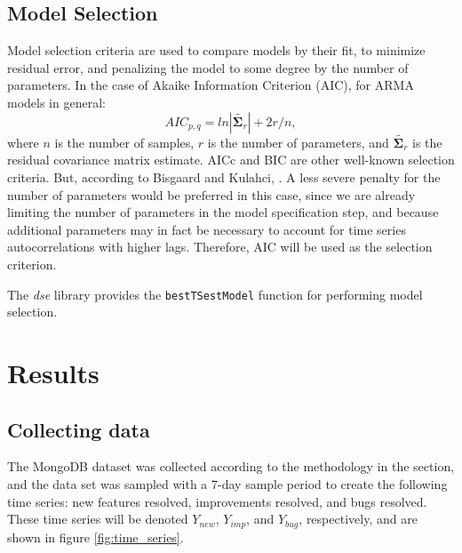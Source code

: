 \documentclass[a4paper]{scrartcl}
\begin{document}
\subsection*{Model Selection}
Model selection criteria are used to compare models by their fit, to minimize residual error, and penalizing the model to some degree by the number of parameters. In the case of Akaike Information Criterion (AIC), for ARMA models in general:
\begin{equation}
AIC_{p,q}=ln{|\tilde{\mathbf{\Sigma}_r}|}+2r/n,
\end{equation}
where $n$ is the number of samples, $r$ is the number of parameters, and  $\tilde{\mathbf{\Sigma}_r}$ is the residual covariance matrix estimate. AICc and BIC are other well-known selection criteria. But, according to Bisgaard and Kulahci, \cite{bisgaard2011time}. A less severe penalty for the number of parameters would be preferred in this case, since we are already limiting the number of parameters in the model specification step, and because additional parameters may in fact be necessary to account for time series autocorrelations with higher lags. Therefore, AIC will be used as the selection criterion.

The \textit{dse} library provides the \texttt{bestTSestModel} function for performing model selection.

\section*{Results}
\label{sec:results}

\subsection*{Collecting data}

The MongoDB dataset was collected according to the methodology in the  section, and the data set was sampled with a 7-day sample period to create the following time series: new features resolved, improvements resolved, and bugs resolved. These time series will be denoted $Y_{new}$, $Y_{imp}$, and $Y_{bug}$, respectively, and are shown in figure \ref{fig:time_series}.
\end{document}
